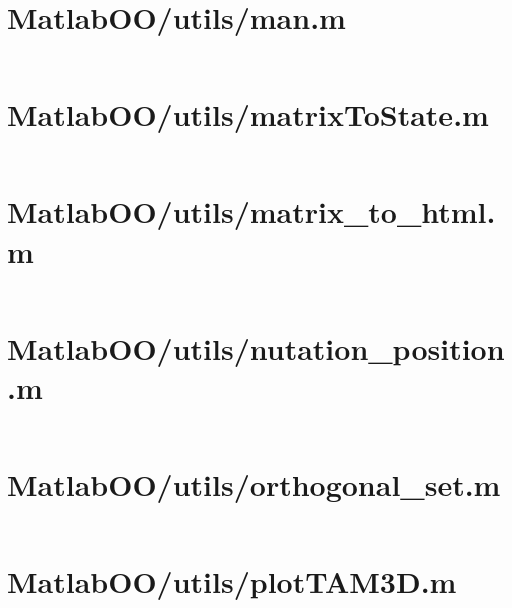 \section*{MatlabOO/utils/man.m}\label{code:MatlabOO/utils/man.m}
\inputminted[linenos,fontsize=\scriptsize]{matlab}{/home/dcouture/git/mathyourlife/TSatPy/beta_versions/matlab_object_oriented/utils/man.m}

\pagebreak
\section*{MatlabOO/utils/matrixToState.m}\label{code:MatlabOO/utils/matrixToState.m}
\inputminted[linenos,fontsize=\scriptsize]{matlab}{/home/dcouture/git/mathyourlife/TSatPy/beta_versions/matlab_object_oriented/utils/matrixToState.m}

\pagebreak
\section*{MatlabOO/utils/matrix\_to\_html.m}\label{code:MatlabOO/utils/matrix_to_html.m}
\inputminted[linenos,fontsize=\scriptsize]{matlab}{/home/dcouture/git/mathyourlife/TSatPy/beta_versions/matlab_object_oriented/utils/matrix_to_html.m}

\pagebreak
\section*{MatlabOO/utils/nutation\_position.m}\label{code:MatlabOO/utils/nutation_position.m}
\inputminted[linenos,fontsize=\scriptsize]{matlab}{/home/dcouture/git/mathyourlife/TSatPy/beta_versions/matlab_object_oriented/utils/nutation_position.m}

\pagebreak
\section*{MatlabOO/utils/orthogonal\_set.m}\label{code:MatlabOO/utils/orthogonal_set.m}
\inputminted[linenos,fontsize=\scriptsize]{matlab}{/home/dcouture/git/mathyourlife/TSatPy/beta_versions/matlab_object_oriented/utils/orthogonal_set.m}

\pagebreak
\section*{MatlabOO/utils/plotTAM3D.m}\label{code:MatlabOO/utils/plotTAM3D.m}
\inputminted[linenos,fontsize=\scriptsize]{matlab}{/home/dcouture/git/mathyourlife/TSatPy/beta_versions/matlab_object_oriented/utils/plotTAM3D.m}

